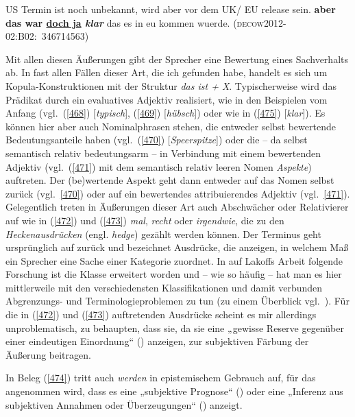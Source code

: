 \begin{exe}
	\ex\label{475} 
	US Termin ist noch unbekannt, wird aber vor dem UK/ EU release sein. \textbf{aber das war \underline{doch ja} \textit{klar}} das es in eu kommen 			wuerde.    
	\newline		                                              
	\hbox{}\hfill\hbox{\scshape(decow2012-02:B02: 346714563)}
\end{exe} 
Mit allen diesen Äußerungen gibt der Sprecher eine Bewertung eines Sachverhalts ab. In fast allen Fällen dieser Art, die ich gefunden habe, handelt es sich um Kopula-Konstruktionen mit der Struktur \textit{das ist + X}. Typischerweise wird das Prädikat durch ein eva\-luatives Adjektiv realisiert, wie in den Beispielen vom Anfang (vgl.\ (\ref{468}) [\textit{typisch}], (\ref{469}) [\textit{hübsch}]) oder wie in (\ref{475}) [\textit{klar}]). Es können hier aber auch Nominalphrasen stehen, die entweder selbst bewertende Bedeutungsanteile haben (vgl.\ (\ref{470}) [\textit{Speerspitze}]) oder die – da selbst semantisch relativ bedeutungsarm – in Verbindung mit einem bewertenden Adjektiv (vgl.\ (\ref{471}) mit dem semantisch relativ leeren Nomen \textit{Aspekte}) auftreten. Der (be)wertende Aspekt geht dann entweder auf das Nomen selbst zurück (vgl.\ \ref{470}) oder auf ein bewertendes attribuierendes Adjektiv (vgl.\ \ref{471}). Gelegentlich treten in Äußerungen dieser Art auch Abschwächer oder Relativierer auf wie in (\ref{472}) und (\ref{473}) \textit{mal}, \textit{recht} oder \textit{irgendwie}, die zu den \textit{Heckenausdrücken} (engl. \textit{hedge})  gezählt werden können. Der Terminus geht ursprünglich auf \citet{Lakoff1973} zurück und be\-zeichnet Ausdrücke, die anzeigen, in welchem Maß ein Sprecher eine Sache einer Kategorie zuordnet. In auf Lakoffs Arbeit folgende Forschung ist die Klasse erweitert worden und – wie so häufig – hat man es hier mittlerweile mit den verschiedensten Klassifikationen und damit verbunden Abgrenzungs- und Terminologieproblemen zu tun (zu einem Überblick vgl.\ \citealt[Kapitel 3]{Clemen1998}). Für die in (\ref{472}) und (\ref{473}) auftretenden Ausdrücke scheint es mir allerdings unproblematisch, zu behaupten, dass sie, da sie eine „gewisse Reserve gegenüber einer eindeutigen Einordnung“ (\citealt[10]{Clemen1998}) anzeigen, zur subjektiven Färbung  der Äußerung beitragen. 

In Beleg (\ref{474}) tritt auch \textit{werden} in epistemischem Gebrauch  auf, für das angenommen wird, dass es eine „subjektive Prognose“  (\citealt[39]{Clemen1998}) oder eine „Inferenz aus subjektiven Annahmen oder Überzeugungen“ (\citealt[1901]{Zifonun1997}) anzeigt. 

